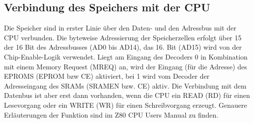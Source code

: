 \subsection{Verbindung des Speichers mit der CPU}
Die Speicher sind in erster Linie über den Daten- und den Adressbus mit der CPU verbunden. Die byteweise Adressierung der Speicherzellen erfolgt über 15 der 16 Bit des Adressbusses (AD0 bis AD14), das 16. Bit (AD15) wird von der Chip-Enable-Logik verwendet. Liegt am Eingang des Decoders 0 in Kombination mit einem Memory Request (MREQ) an, wird der Eingang (für die Adresse) des EPROMS (EPROM bzw CE) aktiviert, bei 1 wird vom Decoder der Adresseingang des SRAMs (SRAMEN bzw. CE) aktiv. Die Verbindung mit dem Datenbus ist aber erst dann vorhanden, wenn die CPU ein READ (RD) für einen Lesevorgang oder ein WRITE (WR) für einen Schreibvorgang erzeugt. Genauere Erläuterungen der Funktion sind im Z80 CPU Users Manual \cite{z80:user} zu finden.

